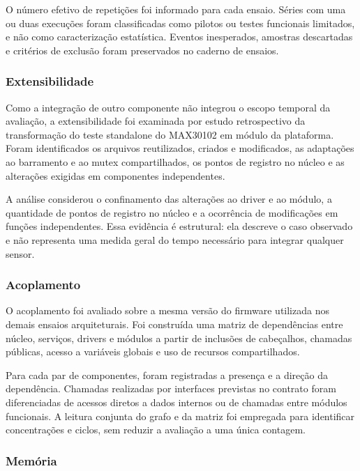 \documentclass[a4paper,12pt]{article}
\begin{document}
O n\'umero efetivo de repeti\c{c}\~oes foi informado para cada ensaio. S\'eries com uma ou duas execu\c{c}\~oes foram classificadas como pilotos ou testes funcionais limitados, e n\~ao como caracteriza\c{c}\~ao estat\'istica. Eventos inesperados, amostras descartadas e crit\'erios de exclus\~ao foram preservados no caderno de ensaios.


\subsubsection{Extensibilidade}

Como a integra\c{c}\~ao de outro componente n\~ao integrou o escopo temporal da avalia\c{c}\~ao, a extensibilidade foi examinada por estudo retrospectivo da transforma\c{c}\~ao do teste standalone do MAX30102 em m\'odulo da plataforma. Foram identificados os arquivos reutilizados, criados e modificados, as adapta\c{c}\~oes ao barramento e ao mutex compartilhados, os pontos de registro no n\'ucleo e as altera\c{c}\~oes exigidas em componentes independentes.


A an\'alise considerou o confinamento das altera\c{c}\~oes ao driver e ao m\'odulo, a quantidade de pontos de registro no n\'ucleo e a ocorr\^encia de modifica\c{c}\~oes em fun\c{c}\~oes independentes. Essa evid\^encia \'e estrutural: ela descreve o caso observado e n\~ao representa uma medida geral do tempo necess\'ario para integrar qualquer sensor.


\subsubsection{Acoplamento}


O acoplamento foi avaliado sobre a mesma vers\~ao do firmware utilizada nos demais ensaios arquiteturais. Foi constru\'ida uma matriz de depend\^encias entre n\'ucleo, servi\c{c}os, drivers e m\'odulos a partir de inclus\~oes de cabe\c{c}alhos, chamadas p\'ublicas, acesso a vari\'aveis globais e uso de recursos compartilhados.


Para cada par de componentes, foram registradas a presen\c{c}a e a dire\c{c}\~ao da depend\^encia. Chamadas realizadas por interfaces previstas no contrato foram diferenciadas de acessos diretos a dados internos ou de chamadas entre m\'odulos funcionais. A leitura conjunta do grafo e da matriz foi empregada para identificar concentra\c{c}\~oes e ciclos, sem reduzir a avalia\c{c}\~ao a uma \'unica contagem.


\subsubsection{Mem\'oria}
\end{document}

